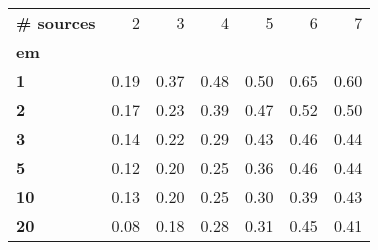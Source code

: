\begin{tabular}{lrrrrrr}
\toprule
\textbf{\# sources} &    2 &    3 &    4 &    5 &    6 &    7 \\
\textbf{em} &      &      &      &      &      &      \\
\midrule
\textbf{1 } & 0.19 & 0.37 & 0.48 & 0.50 & 0.65 & 0.60 \\
\textbf{2 } & 0.17 & 0.23 & 0.39 & 0.47 & 0.52 & 0.50 \\
\textbf{3 } & 0.14 & 0.22 & 0.29 & 0.43 & 0.46 & 0.44 \\
\textbf{5 } & 0.12 & 0.20 & 0.25 & 0.36 & 0.46 & 0.44 \\
\textbf{10} & 0.13 & 0.20 & 0.25 & 0.30 & 0.39 & 0.43 \\
\textbf{20} & 0.08 & 0.18 & 0.28 & 0.31 & 0.45 & 0.41 \\
\bottomrule
\end{tabular}
